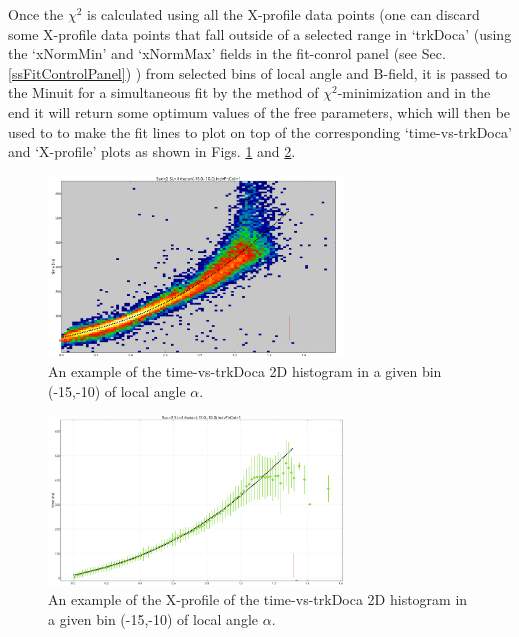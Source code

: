 \documentclass[12pt]{article}
\begin{document}
Once the $\chi^2$ is calculated using all the X-profile data points (one can discard some X-profile data points that fall outside of a selected range in `trkDoca' (using the `xNormMin' and `xNormMax' fields in the fit-conrol panel (see Sec. \ref{ssFitControlPanel}) ) from selected bins of local angle and B-field, it is passed to the Minuit for a simultaneous fit by the method of $\chi^2$-minimization and in the end it will return some optimum values of the free parameters, which will then be used to to make the fit lines to plot on top of the corresponding `time-vs-trkDoca' and `X-profile' plots as shown in Figs. \ref{fTimeVsTrkDocaWithFit} and \ref{fTimeVsTrkDocaXProfileWithFit}.
\begin{figure}
    \centering
    \includegraphics[width=0.7\textwidth]{Figures/time_vs_trkDocaExample_Sec2_SL4_th_m15_m10withFit.png}
    \caption{An example of the time-vs-trkDoca 2D histogram in a given bin (-15,-10) of local angle $\alpha$.}
    \label{fTimeVsTrkDocaWithFit}
\end{figure}


\begin{figure}
    \centering
    \includegraphics[width=0.7\textwidth]{Figures/time_vs_trkDocaXProfileExample_Sec2_SL4_th_m15_m10withFit.png}
    \caption{An example of the X-profile of  the time-vs-trkDoca 2D histogram in a given bin (-15,-10) of local angle $\alpha$.}
    \label{fTimeVsTrkDocaXProfileWithFit}
\end{figure}
\end{document}
